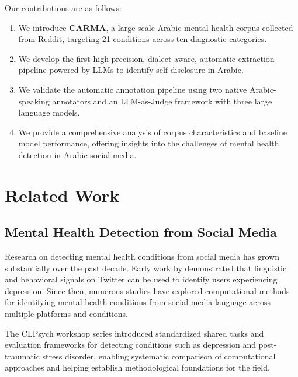 \documentclass[11pt]{article}
\begin{document}
Our contributions are as follows:
\begin{enumerate}
    \item We introduce \textbf{CARMA}, a large-scale Arabic mental health corpus
    collected from Reddit, targeting 21 conditions across ten diagnostic categories.

    \item We develop the first high precision, dialect aware, automatic extraction pipeline powered by LLMs to identify self disclosure in Arabic.

    \item We validate the automatic annotation pipeline using two native Arabic-speaking
    annotators and an LLM-as-Judge framework with three large language
    models.

    \item We provide a comprehensive analysis of corpus characteristics and
    baseline model performance, offering insights into the challenges of mental
    health detection in Arabic social media.

\end{enumerate}



\section{Related Work}
\label{sec:related_work}

\subsection{Mental Health Detection from Social Media}
\label{subsec:related_social_media}

Research on detecting mental health conditions from social media has grown
substantially over the past decade. Early work by \citet{de2013predicting}
demonstrated that linguistic and behavioral signals on Twitter can be used to
identify users experiencing depression. Since then, numerous studies have explored
computational methods for identifying mental health conditions from social media
language across multiple platforms and conditions.

The CLPsych workshop series \cite{coppersmith2015clpsych} introduced standardized
shared tasks and evaluation frameworks for detecting conditions such as depression
and post-traumatic stress disorder, enabling systematic comparison of computational
approaches and helping establish methodological foundations for the field.
\end{document}

